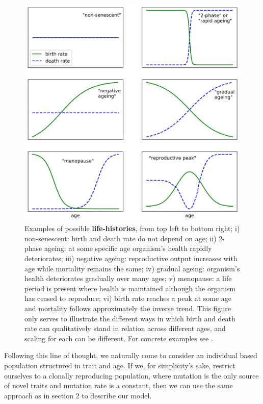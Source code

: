 \documentclass[11pt, a4paper]{article}
\theoremstyle{definition}
\begin{document}
    \begin{figure}
        \center
        \includegraphics[scale=0.7]{figures/life-histories.png}
        \caption{Examples of possible \textbf{life-histories}, from top left to bottom right; i) non-senescent: birth and death rate do not depend on age; ii) 2-phase ageing: at some specific age organism's health rapidly deteriorates; iii) negative ageing: reproductive output increases with age while mortality remains the same; iv) gradual ageing: organism's health deteriorates gradually over many ages; v) menopause: a life period is present where health is maintained although the organism has ceased to
        reproduce; vi) birth rate reaches a peak at some age and mortality follows approximately the inverse trend. This figure only serves to illustrate the different ways in which birth and death rate can qualitatively stand in relation across different ages, and scaling for each can be different. For concrete examples see \autocite{jones2014diversity}.}
        \label{fig1}
    \end{figure}

    Following this line of thought, we naturally come to consider an individual based population structured in trait and age. If we, for simplicity's sake, restrict ourselves to a clonally reproducing population, where mutation is the only source of novel traits and mutation rate is a constant, then we can use the same approach as in section 2 to describe our model.
\end{document}
